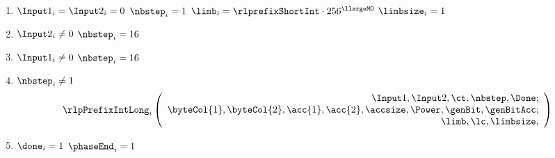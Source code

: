 \begin{center}
\end{center}
\begin{enumerate}
	\item \If $\Input1_{i} = \Input2_{i}=0$ \Then $\nbstep_{i}=1$ \et $\limb_{i}=\rlprefixShortInt \cdot 256 ^{\llargeMO}$ \et $\limbsize_{i}=1$
    \item \If $\Input2_{i} \neq 0$ \Then $\nbstep_{i}=16$ 
    \item \If $\Input1_{i} \neq 0$ \Then $\nbstep_{i}=16$
    \item \If $\nbstep_{i} \neq 1$ \Then
        \[
        \rlpPrefixIntLong_{i}
        \left(
        \begin{array}{r}
            \Input1,
            \Input2,
            \ct,
            \nbstep,
            \Done;\\
            \byteCol{1},
            \byteCol{2},
            \acc{1},
            \acc{2},
            \accsize,
            \Power,
            \genBit,
            \genBitAcc; \\
            \limb,
            \lc,
            \limbsize,
        \end{array}
        \right)
    \]
    \item \If $\done_{i}=1$ \Then $\phaseEnd_{i}=1$
\end{enumerate}
